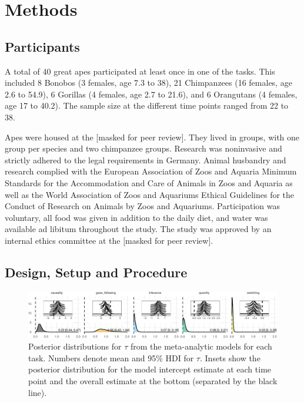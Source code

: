 \documentclass[10pt, letterpaper]{article}
\newenvironment{CodeChunk}{}{}
\begin{document}
\hypertarget{methods}{%
\section{Methods}\label{methods}}

\hypertarget{participants}{%
\subsection{Participants}\label{participants}}

A total of 40 great apes participated at least once in one of the tasks.
This included 8 Bonobos (3 females, age 7.3 to 38), 21 Chimpanzees (16
females, age 2.6 to 54.9), 6 Gorillas (4 females, age 2.7 to 21.6), and
6 Orangutans (4 females, age 17 to 40.2). The sample size at the
different time points ranged from 22 to 38.

Apes were housed at the {[}masked for peer review{]}. They lived in
groups, with one group per species and two chimpanzee groups. Research
was noninvasive and strictly adhered to the legal requirements in
Germany. Animal husbandry and research complied with the European
Association of Zoos and Aquaria Minimum Standards for the Accommodation
and Care of Animals in Zoos and Aquaria as well as the World Association
of Zoos and Aquariums Ethical Guidelines for the Conduct of Research on
Animals by Zoos and Aquariums. Participation was voluntary, all food was
given in addition to the daily diet, and water was available ad libitum
throughout the study. The study was approved by an internal ethics
committee at the {[}masked for peer review{]}.

\hypertarget{design-setup-and-procedure}{%
\subsection{Design, Setup and
Procedure}\label{design-setup-and-procedure}}

\begin{CodeChunk}
\begin{figure}[h]

{\centering \includegraphics{figs/metaplot-1} 

}

\caption[Posterior distributions for $\tau$ from the meta-analytic models for each task]{Posterior distributions for $\tau$ from the meta-analytic models for each task. Numbers denote mean and 95\% HDI for $\tau$. Insets show the posterior distribution for the model intercept estimate at each time point and the overall estimate at the bottom (separated by the black line).}\label{fig:metaplot}
\end{figure}
\end{CodeChunk}
\end{document}
